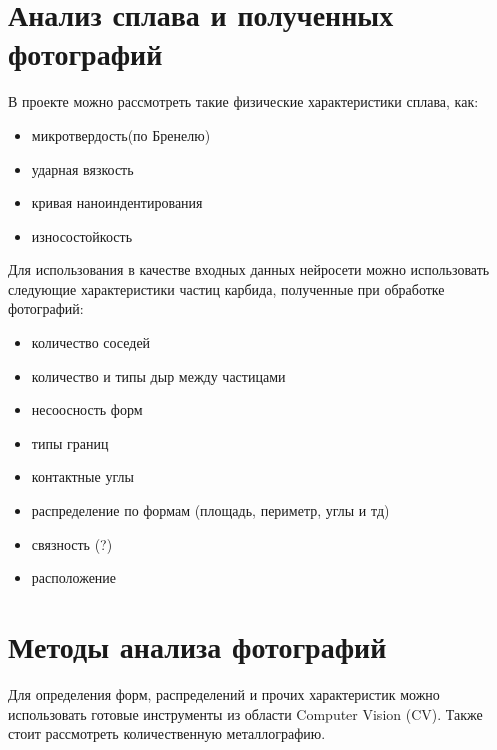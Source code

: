\documentclass[a4paper, 14pt]{article}
\begin{document}
		\newpage
	\section{Анализ сплава и полученных фотографий}
	
	В проекте можно рассмотреть такие физические характеристики сплава, как:
	
	\begin{itemize}
		\item микротвердость(по Бренелю)
		
		\item ударная вязкость
		
		\item кривая наноиндентирования
		
		\item износостойкость
	\end{itemize}


	Для использования в качестве входных данных нейросети можно использовать следующие
	характеристики частиц карбида, полученные при обработке фотографий:
	
	\begin{itemize}
		\item количество соседей 
		
		\item количество и типы дыр между частицами
		
		\item несоосность форм
		
		\item типы границ
		
		\item контактные углы
		
		\item распределение по формам (площадь, периметр, углы и тд) 
		
		\item связность (?)
	
		\item расположение 
	\end{itemize}
	
	\section{Методы анализа фотографий}
	
	Для определения форм, распределений и прочих характеристик можно использовать готовые 
	инструменты из области Computer Vision (CV). 
	Также стоит рассмотреть количественную металлографию. 
	

	


	
\end{document}
